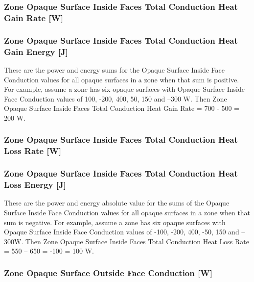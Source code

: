 \subsubsection{Zone Opaque Surface Inside Faces Total Conduction Heat Gain Rate {[}W{]}}\label{zone-opaque-surface-inside-faces-total-conduction-heat-gain-rate-w}

\subsubsection{Zone Opaque Surface Inside Faces Total Conduction Heat Gain Energy {[}J{]}}\label{zone-opaque-surface-inside-faces-total-conduction-heat-gain-energy-j}

These are the power and energy sums for the Opaque Surface Inside Face Conduction values for all opaque surfaces in a zone when that sum is positive. For example, assume a zone has six opaque surfaces with Opaque Surface Inside Face Conduction values of 100, -200, 400, 50, 150 and --300 W. Then Zone Opaque Surface Inside Faces Total Conduction Heat Gain Rate = 700 - 500 = 200 W.

\subsubsection{Zone Opaque Surface Inside Faces Total Conduction Heat Loss Rate {[}W{]}}\label{zone-opaque-surface-inside-faces-total-conduction-heat-loss-rate-w}

\subsubsection{Zone Opaque Surface Inside Faces Total Conduction Heat Loss Energy {[}J{]}}\label{zone-opaque-surface-inside-faces-total-conduction-heat-loss-energy-j}

These are the power and energy absolute value for the sums of the Opaque Surface Inside Face Conduction values for all opaque surfaces in a zone when that sum is negative. For example, assume a zone has six opaque surfaces with Opaque Surface Inside Face Conduction values of -100, -200, 400, -50, 150 and --300W. Then Zone Opaque Surface Inside Faces Total Conduction Heat Loss Rate = \textbar{}550 -- 650\textbar{} = \textbar{}-100\textbar{} = 100 W.

\subsubsection{Zone Opaque Surface Outside Face Conduction {[}W{]}}\label{zone-opaque-surface-outside-face-conduction-w}

